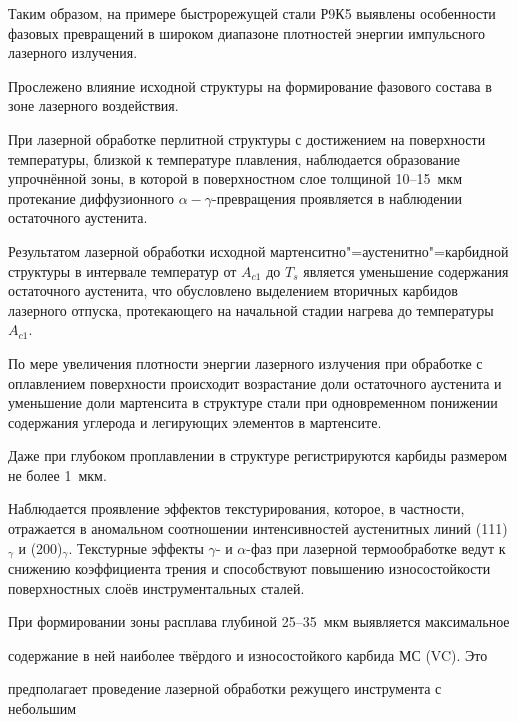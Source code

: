 \smallskip




Таким образом, на примере быстрорежущей стали Р9К5 выявлены особенности фазовых превращений в широком диапазоне плотностей энергии импульсного лазерного излучения. 

Прослежено влияние исходной структуры на формирование фазового состава в зоне лазерного воздействия.



При лазерной обработке перлитной структуры с достижением на поверхности температуры, близкой к температуре плавления, наблюдается образование упрочнённой зоны, в которой в поверхностном слое толщиной 10--15~мкм протекание диффузионного $\alpha -\gamma $-превращения проявляется в наблюдении остаточного аустенита.



Результатом лазерной обработки исходной мартенситно"=аустенитно"=карбидной структуры в интервале температур от $A_{c1}$ до $T_s$ является уменьшение содержания остаточного аустенита, что обусловлено выделением вторичных карбидов лазерного отпуска, протекающего на начальной стадии нагрева до температуры $A_{c1}$.



По мере увеличения плотности энергии лазерного излучения при обработке с оплавлением поверхности происходит возрастание доли остаточного аустенита и уменьшение доли мартенсита в структуре стали при одновременном понижении содержания углерода и легирующих элементов в мартенсите. 

Даже при глубоком проплавлении в структуре регистрируются карбиды размером не более  1~мкм.



Наблюдается проявление эффектов текстурирования, которое, в частности, отражается в аномальном соотношении интенсивностей аустенитных линий (111)$_\gamma$ и (200)$_\gamma$. Текстурные эффекты $\gamma $- и $\alpha $-фаз при лазерной термообработке ведут к снижению коэффициента трения и способствуют повышению износостойкости поверхностных слоёв инструментальных сталей.



При формировании зоны расплава глубиной 25--35~мкм выявляется максимальное

содержание в ней наиболее твёрдого и износостойкого карбида МС (VC). Это

предполагает проведение лазерной обработки режущего инструмента с небольшим

